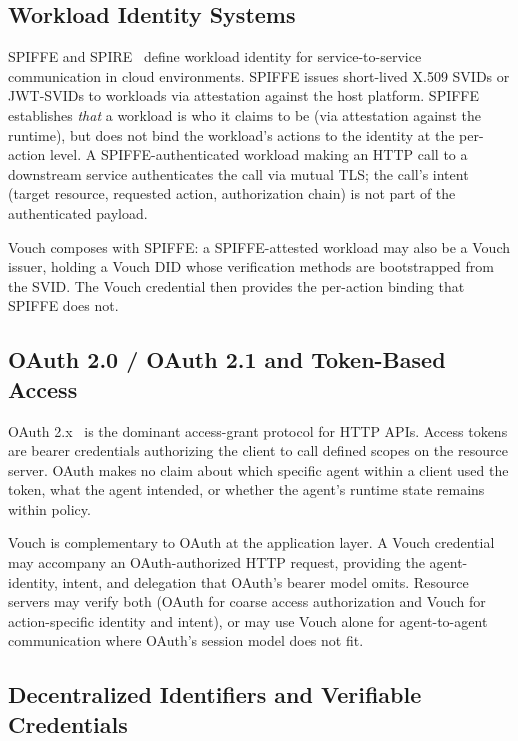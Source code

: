 \documentclass[11pt,a4paper,twocolumn]{article}
\begin{document}
\subsection{Workload Identity Systems}

SPIFFE and SPIRE~\cite{strong2018spiffe} define workload identity for service-to-service communication in cloud environments. SPIFFE issues short-lived X.509 SVIDs or JWT-SVIDs to workloads via attestation against the host platform. SPIFFE establishes \emph{that} a workload is who it claims to be (via attestation against the runtime), but does not bind the workload's actions to the identity at the per-action level. A SPIFFE-authenticated workload making an HTTP call to a downstream service authenticates the call via mutual TLS; the call's intent (target resource, requested action, authorization chain) is not part of the authenticated payload.

Vouch composes with SPIFFE: a SPIFFE-attested workload may also be a Vouch issuer, holding a Vouch DID whose verification methods are bootstrapped from the SVID. The Vouch credential then provides the per-action binding that SPIFFE does not.

\subsection{OAuth 2.0 / OAuth 2.1 and Token-Based Access}

OAuth 2.x~\cite{rfc6749,rfc9700} is the dominant access-grant protocol for HTTP APIs. Access tokens are bearer credentials authorizing the client to call defined scopes on the resource server. OAuth makes no claim about which specific agent within a client used the token, what the agent intended, or whether the agent's runtime state remains within policy.

Vouch is complementary to OAuth at the application layer. A Vouch credential may accompany an OAuth-authorized HTTP request, providing the agent-identity, intent, and delegation that OAuth's bearer model omits. Resource servers may verify both (OAuth for coarse access authorization and Vouch for action-specific identity and intent), or may use Vouch alone for agent-to-agent communication where OAuth's session model does not fit.

\subsection{Decentralized Identifiers and Verifiable Credentials}
\end{document}
